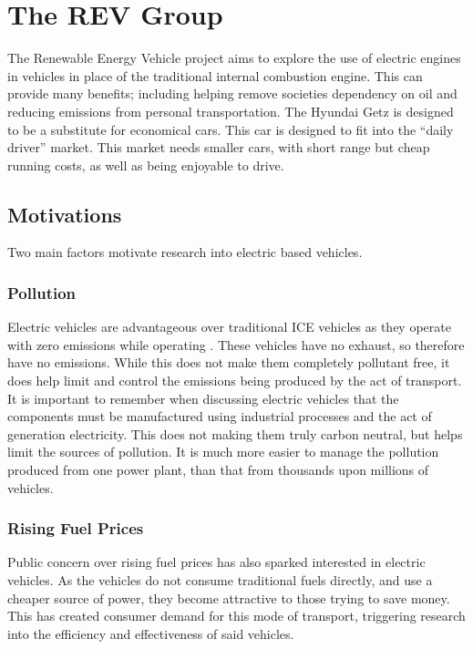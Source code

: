 \section{The REV Group}

The Renewable Energy Vehicle project aims to explore the use of electric engines in vehicles in place of the traditional internal combustion engine. This can provide many benefits; including helping remove societies dependency on oil and reducing emissions from personal transportation. The Hyundai Getz is designed to be a substitute for economical cars. This car is designed to fit into the “daily driver” market. This market needs smaller cars, with short range but cheap running costs, as well as being enjoyable to drive. 

\subsection{Motivations} 
 
Two main factors motivate research into electric based vehicles.

\subsubsection{Pollution} %

Electric vehicles are advantageous over traditional ICE vehicles as they operate with zero emissions while operating . These vehicles have no exhaust, so therefore have no emissions. While this does not make them completely pollutant free, it does help limit and control the emissions being produced by the act of transport. It is important to remember when discussing electric vehicles that the components must be manufactured using industrial processes and the act of generation electricity. This does not making them truly carbon neutral, but helps limit the sources of pollution. It is much more easier to manage the pollution produced from one power plant, than that from thousands upon millions of vehicles.


\subsubsection{Rising Fuel Prices}

Public concern over rising fuel prices has also sparked interested in electric vehicles. As the vehicles do not consume traditional fuels directly, and use a cheaper source of power, they become attractive to those trying to save money. This has created consumer demand for this mode of transport, triggering research into the efficiency and effectiveness of said vehicles.
